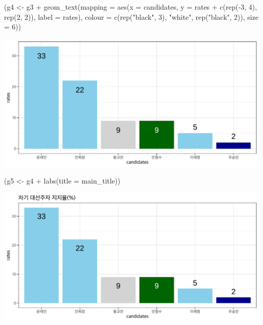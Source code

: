 \documentclass[
]{article}
\newenvironment{Shaded}{}{}
\newcommand{\AttributeTok}[1]{\textcolor[rgb]{0.49,0.56,0.16}{#1}}
\newcommand{\DecValTok}[1]{\textcolor[rgb]{0.25,0.63,0.44}{#1}}
\newcommand{\FunctionTok}[1]{\textcolor[rgb]{0.02,0.16,0.49}{#1}}
\newcommand{\NormalTok}[1]{#1}
\newcommand{\OtherTok}[1]{\textcolor[rgb]{0.00,0.44,0.13}{#1}}
\newcommand{\SpecialCharTok}[1]{\textcolor[rgb]{0.25,0.44,0.63}{#1}}
\newcommand{\StringTok}[1]{\textcolor[rgb]{0.25,0.44,0.63}{#1}}
\begin{document}
\begin{Shaded}
\begin{Highlighting}[]
\NormalTok{(g4 }\OtherTok{\textless{}{-}}\NormalTok{ g3 }\SpecialCharTok{+}
  \FunctionTok{geom\_text}\NormalTok{(}\AttributeTok{mapping =} \FunctionTok{aes}\NormalTok{(}\AttributeTok{x =}\NormalTok{ candidates, }
                          \AttributeTok{y =}\NormalTok{ rates }\SpecialCharTok{+} \FunctionTok{c}\NormalTok{(}\FunctionTok{rep}\NormalTok{(}\SpecialCharTok{{-}}\DecValTok{3}\NormalTok{, }\DecValTok{4}\NormalTok{), }\FunctionTok{rep}\NormalTok{(}\DecValTok{2}\NormalTok{, }\DecValTok{2}\NormalTok{)), }
                          \AttributeTok{label =}\NormalTok{ rates), }
            \AttributeTok{colour =} \FunctionTok{c}\NormalTok{(}\FunctionTok{rep}\NormalTok{(}\StringTok{"black"}\NormalTok{, }\DecValTok{3}\NormalTok{), }\StringTok{"white"}\NormalTok{, }\FunctionTok{rep}\NormalTok{(}\StringTok{"black"}\NormalTok{, }\DecValTok{2}\NormalTok{)),}
            \AttributeTok{size =} \DecValTok{6}\NormalTok{))}
\end{Highlighting}
\end{Shaded}

\includegraphics{poll_JTBC_1702_pdf_files/figure-latex/unnamed-chunk-4-3.pdf}

\begin{Shaded}
\begin{Highlighting}[]
\NormalTok{(g5 }\OtherTok{\textless{}{-}}\NormalTok{ g4 }\SpecialCharTok{+}
  \FunctionTok{labs}\NormalTok{(}\AttributeTok{title =}\NormalTok{ main\_title))}
\end{Highlighting}
\end{Shaded}

\includegraphics{poll_JTBC_1702_pdf_files/figure-latex/unnamed-chunk-4-4.pdf}
\end{document}
